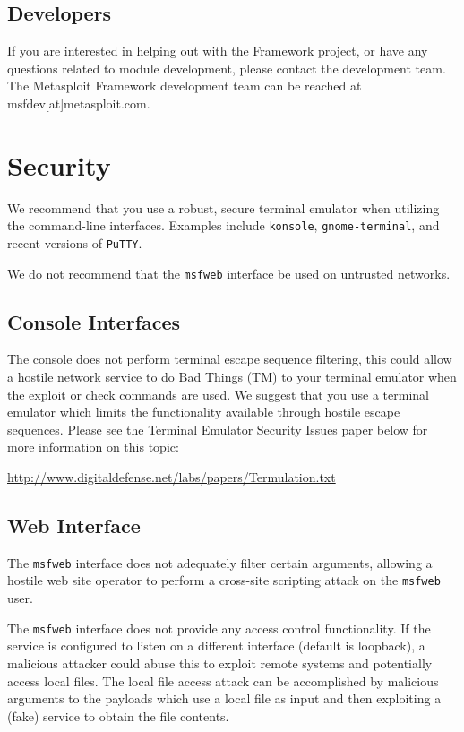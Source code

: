 \documentclass{report}
\begin{document}
\section{Developers}
\par
If you are interested in helping out with the Framework project, or have any
questions related to module development, please contact the development team. The
Metasploit Framework development team can be reached at msfdev[at]metasploit.com.

\pagebreak
\appendix

\pagebreak
\chapter{Security}

\par
We recommend that you use a robust, secure terminal emulator when
utilizing the command-line interfaces. Examples include \texttt{konsole},
\texttt{gnome-terminal}, and recent versions of \texttt{PuTTY}.

\par
We do not recommend that the \texttt{msfweb} interface be used on untrusted
networks. 

	\section{Console Interfaces}
\par
The console does not perform terminal escape sequence filtering, this
could allow a hostile network service to do Bad Things (TM) to your terminal
emulator when the exploit or check commands are used. We suggest that you
use a terminal emulator which limits the functionality available through
hostile escape sequences. Please see the Terminal Emulator Security Issues paper
below for more information on this topic:

\url{http://www.digitaldefense.net/labs/papers/Termulation.txt}


	\section{Web Interface}
\par
The \texttt{msfweb} interface does not adequately filter certain arguments,
allowing a hostile web site operator to perform a cross-site scripting
attack on the \texttt{msfweb} user.

\par
The \texttt{msfweb} interface does not provide any access control functionality. If
the service is configured to listen on a different interface (default is
loopback), a malicious attacker could abuse this to exploit remote systems
and potentially access local files. The local file access attack can be
accomplished by malicious arguments to the payloads which use a local file
as input and then exploiting a (fake) service to obtain the file contents.
	
\end{document}
